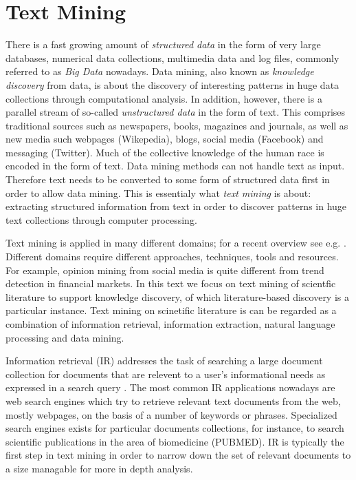 
\chapter{Text Mining}


There is a fast growing amount of \emph{structured data} in the form of very large databases, numerical data collections, multimedia data and log files, commonly referred to as \emph{Big Data} nowadays.
Data mining, also known as \emph{knowledge discovery} from data, is about the discovery of interesting patterns in huge data collections through computational analysis.
In addition, however, there is a parallel stream of so-called \emph{unstructured data} in the form of text.
This comprises traditional sources such as newspapers, books, magazines and journals, as well as new media such webpages (Wikepedia), blogs, social media (Facebook) and messaging (Twitter).
Much of the collective knowledge of the human race is encoded in the form of text. 
Data mining methods can not handle text as input.
Therefore text needs to be converted to some form of structured data first in order to allow data mining.
This is essentialy what \emph{text mining} is about: extracting structured information from text in order to discover patterns in huge text collections through computer processing.

Text mining is applied in many different domains; for a recent overview see e.g. \citep{Aggarwal2012Mining,Weiss2012Fundamentals}.
Different domains require different approaches, techniques, tools and resources.
For example, opinion mining from social media is quite different from trend detection in financial markets. 
In this text we focus on text mining of scientfic literature to support knowledge discovery, of which literature-based discovery is a particular instance.
Text mining on scinetific literature is can be regarded as a combination of information retrieval, information extraction, natural language processing and data mining.

Information retrieval (IR) addresses the task of searching a large document collection for documents that are relevent to a user's informational needs as expressed in a search query \citep{ManningRaghavanSchutze:08}. 
The most common IR applications nowadays are web search engines which try to retrieve relevant text documents from the web, mostly webpages, on the basis of a number of keywords or phrases.
Specialized search engines exists for particular documents collections, for instance, to search scientific publications in the area of biomedicine (PUBMED).
IR is typically the first step in text mining in order to narrow down the set of relevant documents to a size managable for more in depth analysis.

